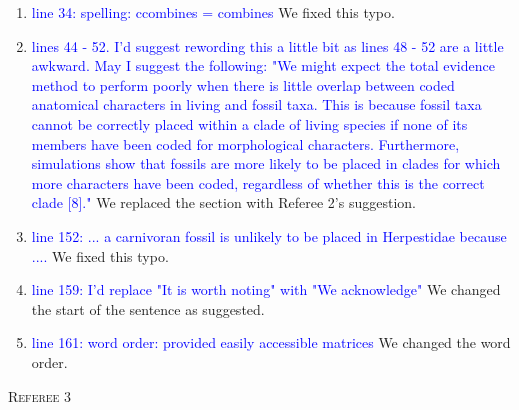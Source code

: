 \documentclass[12pt,letterpaper]{article}
\renewcommand{\section}[1]{%
\bigskip
\begin{center}
\begin{Large}
\normalfont\scshape #1
\medskip
\end{Large}
\end{center}}
\begin{document}
\begin{enumerate}
\item{\textcolor{blue}{line 34: spelling: ccombines = combines}}
We fixed this typo.

\item{\textcolor{blue}{lines 44 - 52. I'd suggest rewording this a little bit as lines 48 - 52 are a little awkward. May I suggest the following:
"We might expect the total evidence method to perform poorly when there is little overlap between coded anatomical characters in living and fossil taxa. This is because fossil taxa cannot be correctly placed within a clade of living species if none of its members have been coded for morphological characters. Furthermore, simulations show that fossils are more likely to be placed in clades for which more characters have been coded, regardless of whether this is the correct clade [8]."}}
We replaced the section with Referee 2's suggestion.

\item{\textcolor{blue}{line 152: ... a carnivoran fossil is unlikely to be placed in Herpestidae because ....}}
We fixed this typo.

\item{\textcolor{blue}{line 159: I'd replace "It is worth noting" with "We acknowledge"}}
We changed the start of the sentence as suggested.

\item{\textcolor{blue}{line 161: word order: provided easily accessible matrices}}
We changed the word order.

\end{enumerate}


\section{Referee 3}
\end{document}
